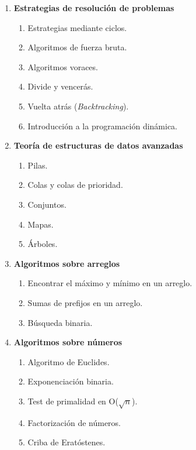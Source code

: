 \begin{enumerate}
  \item \textbf{Estrategias de resolución de problemas}

  \begin{enumerate}
    \item \label{itm:12.1} Estrategias mediante ciclos.
    \item \label{itm:12.2} Algoritmos de fuerza bruta.
    \item \label{itm:12.3} Algoritmos voraces.
    \item \label{itm:12.4} Divide y vencerás.
    \item \label{itm:12.5} Vuelta atrás (\textit{Backtracking}).
    \item \label{itm:12.6} Introducción a la programación dinámica.
  \end{enumerate}

  \item \textbf{Teoría de estructuras de datos avanzadas}

  \begin{enumerate}
    \item \label{itm:13.1} Pilas.
    \item \label{itm:13.2} Colas y colas de prioridad.
    \item \label{itm:13.3} Conjuntos.
    \item \label{itm:13.4} Mapas.
    \item \label{itm:13.5} Árboles.
  \end{enumerate}

  \item \textbf{Algoritmos sobre arreglos}

  \begin{enumerate}
    \item \label{itm:14.1} Encontrar el máximo y mínimo en un arreglo.
    \item \label{itm:14.2} Sumas de prefijos en un arreglo.
    \item \label{itm:14.3} Búsqueda binaria.
  \end{enumerate}

  \item \textbf{Algoritmos sobre números}

  \begin{enumerate}
    \item \label{itm:15.1} Algoritmo de Euclides.
    \item \label{itm:15.2} Exponenciación binaria.
    \item \label{itm:15.3} Test de primalidad en O($\sqrt{n}$).
    \item \label{itm:15.4} Factorización de números.
    \item \label{itm:15.5} Criba de Eratóstenes.
  \end{enumerate}


\end{enumerate}
